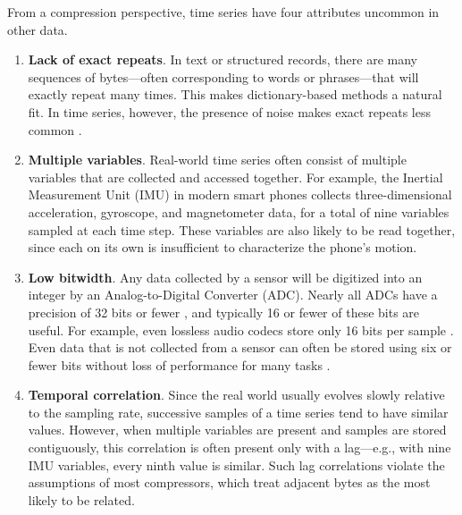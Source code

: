 
From a compression perspective, time series have four attributes uncommon in other data.

\begin{enumerate}
    \item \textbf{Lack of exact repeats}. In text or structured records, there are many sequences of bytes---often corresponding to words or phrases---that will exactly repeat many times. This makes dictionary-based methods a natural fit. In time series, however, the presence of noise makes exact repeats less common \cite{extract, epenthesis}.
    \item \textbf{Multiple variables}. Real-world time series often consist of multiple variables that are collected and accessed together. For example, the Inertial Measurement Unit (IMU) in modern smart phones collects three-dimensional acceleration, gyroscope, and magnetometer data, for a total of nine variables sampled at each time step. These variables are also likely to be read together, since each on its own is insufficient to characterize the phone's motion. %
    \item \textbf{Low bitwidth}. Any data collected by a sensor will be digitized into an integer by an Analog-to-Digital Converter (ADC). Nearly all ADCs have a precision of 32 bits or fewer \cite{digikeyADCs}, and typically 16 or fewer of these bits are useful. For example, even lossless audio codecs store only 16 bits per sample \cite{flac, shorten}. Even data that is not collected from a sensor can often be stored using six or fewer bits without loss of performance for many tasks \cite{epenthesis, mdlIntrinsic, sax}.
    \item \textbf{Temporal correlation}. Since the real world usually evolves slowly relative to the sampling rate, successive samples of a time series tend to have similar values. However, when multiple variables are present and samples are stored contiguously, this correlation is often present only with a lag---e.g., with nine IMU variables, every ninth value is similar. Such lag correlations violate the assumptions of most compressors, which treat adjacent bytes as the most likely to be related.
\end{enumerate}

